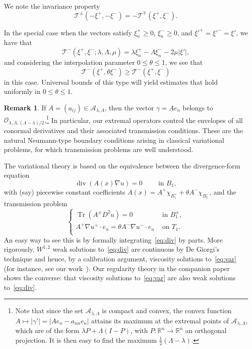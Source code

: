 \documentclass[letter,11pt]{amsart}
\newcommand{\R}{\mathbb{R}}
\newcommand{\tr}[1]{\operatorname{Tr}(#1)}
\newcommand{\chara}[1]{\chi_{#1}}
\renewcommand{\div}{\operatorname{div}}
\newcommand{\id}{I}
\newcommand{\ellmat}{\mathcal{A}_{\lambda, \Lambda}}
\newcommand{\env}{\mathcal{O}}
\newcommand{\tcal}{\mathcal{T}}
\theoremstyle{definition}
\newtheorem{rem}[thm]{Remark}
\numberwithin{equation}{section}
\begin{document}
\medskip

We note the invariance property
\[
\tcal^{\pm}(- \xi^{+}, - \xi^{-}) = - \tcal^{\mp}(\xi^{+}, \xi^{-}).
\]

\medskip

In the special case when the vectors satisfy $\xi_n^{+} \geq 0$, $\xi_n^{-} \geq 0$, and $\xi'^{+} = \xi'^{-} = \xi'$, we have that
\begin{equation}
\label{tmin}
\tcal^{-}(\xi^{+}, \xi^{-}; \lambda, \Lambda, \mu) = \lambda \xi_n^{+} - \Lambda \xi_n^{-} - 2\mu |\xi'|,
\end{equation}
and considering the interpolation parameter $0 \leq \theta \leq 1$, we see that
\[
\tcal^{-}(\xi^{+}, \theta \xi^{-}) \geq \tcal^{-}(\xi^{+}, \xi^{-})
\]
in this case.
Universal bounds of this type will yield estimates that hold uniformly in $0 \leq \theta \leq 1$.

\medskip

\begin{rem}
If $A = (a_{ij}) \in \ellmat$, then the vector $\gamma = A e_n$ belongs to $\env_{\lambda, \Lambda,(\Lambda-\lambda)/2}$.\footnote{Note that since the set $\ellmat$ is compact and convex, the convex function $A \mapsto |\gamma'| = |A e_n - a_{nn} e_n|$ attains its maximum at the extremal points of $\ellmat$, which are of the form $\lambda P + \Lambda (\id - P)$, with $P \colon \R^n \to \R^n$ an orthogonal projection. It is then easy to find the maximum $\frac{1}{2}(\Lambda-\lambda)$.}
In particular, our extremal operators control the envelopes of all conormal derivatives and their associated transmission conditions.
These are the natural Neumann-type boundary conditions arising in classical variational problems, for which transmission problems are well understood.

The variational theory is based on the equivalence between the divergence-form equation
\begin{equation}
\label{eq:div}
\div (A(x) \nabla u) = 0 \qquad \text{ in } B_1,
\end{equation}
with (say) piecewise constant coefficients $A(x) = A^{+} \chara{B_1^{+}} + \theta A^{-} \chara{B_{1}^{-}}$, and the transmission problem
\begin{equation}
\label{eq:var}
\begin{cases}
\tr{A^{\pm}D^2 u} = 0 & \text{ in } B_1^{\pm},\\
A^{+} \nabla u^{+} \cdot e_n = \theta A^{-} \nabla u^{-} \cdot e_n & \text{ on } T_1.\\
\end{cases}
\end{equation}
An easy way to see this is by formally integrating~\eqref{eq:div} by parts.
More rigorously, $W^{1,2}$ weak solutions to~\eqref{eq:div} are continuous by De Giorgi's technique and hence, by a calibration argument, viscosity solutions to~\eqref{eq:var} (for instance, see our work~\cite{CEF}).
Our regularity theory in the companion paper~\cite{E} shows the converse: that viscosity solutions to~\eqref{eq:var} are also weak solutions to~\eqref{eq:div}.
\end{rem}
\end{document}
